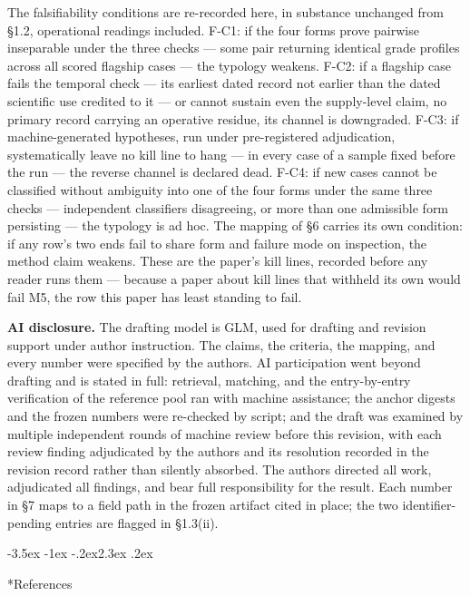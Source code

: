 \documentclass[11pt,a4paper]{article}
\makeatletter
\renewcommand\section{\@startsection{section}{1}{\z@}%
  {-3.5ex \@plus -1ex \@minus -.2ex}{2.3ex \@plus .2ex}%
  {\normalfont\Large\bfseries\raggedright}}
\makeatother
\begin{document}
The falsifiability conditions are re-recorded here, in substance unchanged from §1.2, operational readings included. F-C1: if the four forms prove pairwise inseparable under the three checks — some pair returning identical grade profiles across all scored flagship cases — the typology weakens. F-C2: if a flagship case fails the temporal check — its earliest dated record not earlier than the dated scientific use credited to it — or cannot sustain even the supply-level claim, no primary record carrying an operative residue, its channel is downgraded. F-C3: if machine-generated hypotheses, run under pre-registered adjudication, systematically leave no kill line to hang — in every case of a sample fixed before the run — the reverse channel is declared dead. F-C4: if new cases cannot be classified without ambiguity into one of the four forms under the same three checks — independent classifiers disagreeing, or more than one admissible form persisting — the typology is ad hoc. The mapping of §6 carries its own condition: if any row's two ends fail to share form and failure mode on inspection, the method claim weakens. These are the paper's kill lines, recorded before any reader runs them — because a paper about kill lines that withheld its own would fail M5, the row this paper has least standing to fail.

\textbf{AI disclosure.} The drafting model is GLM, used for drafting and revision support under author instruction. The claims, the criteria, the mapping, and every number were specified by the authors. AI participation went beyond drafting and is stated in full: retrieval, matching, and the entry-by-entry verification of the reference pool ran with machine assistance; the anchor digests and the frozen numbers were re-checked by script; and the draft was examined by multiple independent rounds of machine review before this revision, with each review finding adjudicated by the authors and its resolution recorded in the revision record rather than silently absorbed. The authors directed all work, adjudicated all findings, and bear full responsibility for the result. Each number in §7 maps to a field path in the frozen artifact cited in place; the two identifier-pending entries are flagged in §1.3(ii).

\section*{References}
\end{document}
